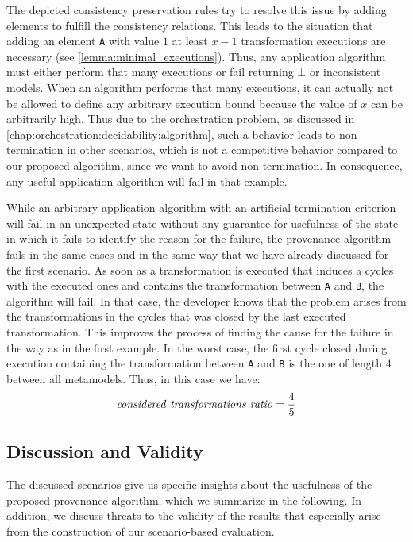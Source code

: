 The depicted consistency preservation rules try to resolve this issue by adding elements to fulfill the consistency relations.
This leads to the situation that adding an element \texttt{A} with value $1$ at least $x-1$ transformation executions are necessary (see \autoref{lemma:minimal_executions}).
Thus, any application algorithm must either perform that many executions or fail returning $\bot$ or inconsistent models.
When an algorithm performs that many executions, it can actually not be allowed to define any arbitrary execution bound because the value of $x$ can be arbitrarily high.
Thus due to the orchestration problem, as discussed in \autoref{chap:orchestration:decidability:algorithm}, such a behavior leads to non-termination in other scenarios, which is not a competitive behavior compared to our proposed algorithm, since we want to avoid non-termination.
In consequence, any useful application algorithm will fail in that example.

While an arbitrary application algorithm with an artificial termination criterion will fail in an unexpected state without any guarantee for usefulness of the state in which it fails to identify the reason for the failure, the provenance algorithm fails in the same cases and in the same way that we have already discussed for the first scenario.
As soon as a transformation is executed that induces a cycles with the executed ones and contains the transformation between \texttt{A} and \texttt{B}, the algorithm will fail.
In that case, the developer knows that the problem arises from the transformations in the cycles that was closed by the last executed transformation.
This improves the process of finding the cause for the failure in the way as in the first example.
In the worst case, the first cycle closed during execution containing the transformation between \texttt{A} and \texttt{B} is the one of length $4$ between all metamodels.
Thus, in this case we have:
\begin{align*}
    \mathit{considered\ transformations\ ratio} = \frac{4}{5}
\end{align*}


\subsection{Discussion and Validity}
\label{chap:correctness_evaluation:orchestration:discussion}

The discussed scenarios give us specific insights about the usefulness of the proposed provenance algorithm, which we summarize in the following.
In addition, we discuss threats to the validity of the results that especially arise from the construction of our scenario-based evaluation.


